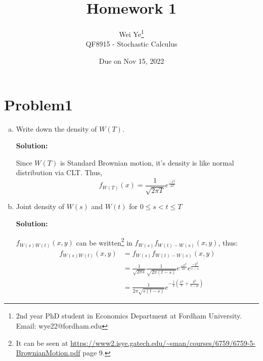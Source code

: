 \documentclass[11pt]{article} %
\title{Homework 1}
\author{Wei Ye\footnote{2nd year PhD student in Economics Department at Fordham University. Email: wye22@fordham.edu}
    \\ QF8915 - Stochastic Calculus}
\date{Due on Nov 15, 2022}
\begin{document}
\maketitle

\section*{Problem1}
\begin{enumerate}[(a)]
    \item Write down the density of $W(T)$.
    
    \textbf{Solution:}

    Since $W(T)$ is Standard Brownian motion, it's density is like normal distribution via CLT.
    Thus, 
    \begin{equation*}
        f_{W(T)}(x) = \frac{1}{\sqrt{2\pi T}}e^{\frac{-x^2}{2T}}
    \end{equation*}

    \item Joint density of $W(s)$ and $W(t)$ for $0 \leq s < t \leq T$
    
    \textbf{Solution:}

    $f_{W(s)W(t)}(x,y)$ can be written\footnote{It can be seen at \url{https://www2.isye.gatech.edu/~sman/courses/6759/6759-5-BrownianMotion.pdf} page 9.} in $f_{W(s)}f_{W(t)-W(s)}(x,y)$, thus:
    \begin{align*}
        f_{W(s)W(t)}(x,y) &= f_{W(s)}f_{W(t)-W(s)}(x,y)\\
                        &= \frac{1}{\sqrt{2\pi s}}\frac{1}{\sqrt{2\pi (t-s)}}e^{\frac{-x^2}{2s}}e^{\frac{-y^2}{t-s}}\\
                        &=\frac{1}{2\pi \sqrt{s(t-s)}}e^{-\frac{1}{2}(\frac{x^2}{s}+\frac{y^2}{t-w})}
    \end{align*}

\end{enumerate}
\end{document}
